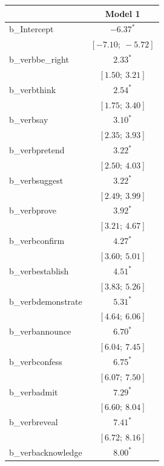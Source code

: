 \documentclass[11pt,fleqn]{article}
\newcommand{\6}{\mbox{$[\hspace*{-.6mm}[$}}
\newcommand{\9}{\mbox{$]\hspace*{-.6mm}]$}}
\begin{document}
{\begin{table}
\begin{center}
\begin{tabular}{l c }
\hline
 & Model 1 \\
\hline
b\_Intercept       & $-6.37^{*}$       \\
                   & $[-7.10;\ -5.72]$ \\
b\_verbbe\_right   & $2.33^{*}$        \\
                   & $[1.50;\ 3.21]$   \\
b\_verbthink       & $2.54^{*}$        \\
                   & $[1.75;\ 3.40]$   \\
b\_verbsay         & $3.10^{*}$        \\
                   & $[2.35;\ 3.93]$   \\
b\_verbpretend     & $3.22^{*}$        \\
                   & $[2.50;\ 4.03]$   \\
b\_verbsuggest     & $3.22^{*}$        \\
                   & $[2.49;\ 3.99]$   \\
b\_verbprove       & $3.92^{*}$        \\
                   & $[3.21;\ 4.67]$   \\
b\_verbconfirm     & $4.27^{*}$        \\
                   & $[3.60;\ 5.01]$   \\
b\_verbestablish   & $4.51^{*}$        \\
                   & $[3.83;\ 5.26]$   \\
b\_verbdemonstrate & $5.31^{*}$        \\
                   & $[4.64;\ 6.06]$   \\
b\_verbannounce    & $6.70^{*}$        \\
                   & $[6.04;\ 7.45]$   \\
b\_verbconfess     & $6.75^{*}$        \\
                   & $[6.07;\ 7.50]$   \\
b\_verbadmit       & $7.29^{*}$        \\
                   & $[6.60;\ 8.04]$   \\
b\_verbreveal      & $7.41^{*}$        \\
                   & $[6.72;\ 8.16]$   \\
b\_verbacknowledge & $8.00^{*}$        \\

\end{tabular}
\end{center}
\end{table}}
\end{document}
